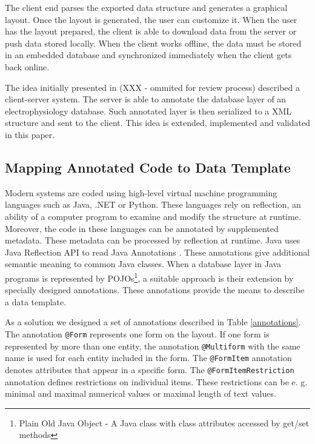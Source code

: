 \documentclass[a4paper,twoside]{article}
\begin{document}
The client end parses the exported data structure and generates a graphical layout. Once the layout is generated, the user can customize it. When the user has the layout prepared, the client is able to download data from the server or push data stored locally. When the client works offline, the data must be stored in an embedded database and synchronized immediately when the client gets back online.



The idea initially presented in (XXX - ommited for review process) described a client-server system. The server is able to annotate the database layer of an electrophysiology database. Such annotated layer is then serialized to a XML structure and sent to the client. This idea is extended, implemented and validated in this paper.

\subsection{Mapping Annotated Code to Data Template}\label{Mapping_Code_To_Template}

Modern systems are coded using high-level virtual machine programming languages such as Java, .NET or Python. These languages rely on reflection, an ability of a computer program to examine and modify the structure at runtime. Moreover, the code in these languages can be annotated by supplemented metadata. These metadata can be processed by reflection at runtime. Java uses Java Reflection API \cite{1932394184} to read Java Annotations \cite{AnnotationsJavaDevGuide}. These annotations give additional semantic meaning to common Java classes. When a database layer in Java programs is represented by POJOs\footnote{Plain Old Java Object - A Java class with class attributes accessed by get/set methods}, a suitable approach is their extension by specially designed annotations. These annotations provide the means to describe a data template.

As a solution we designed a set of annotations described in Table \ref{annotations}. The annotation \texttt{@Form} represents one form on the layout. If one form is represented by more than one entity, the annotation \texttt{@Multiform} with the same name is used for each entity included in the form. The \texttt{@FormItem} annotation denotes attributes that appear in a specific form. The \texttt{@FormItemRestriction} annotation defines restrictions on individual items. These restrictions can be e. g. minimal and maximal numerical values or maximal length of text values.
\end{document}
